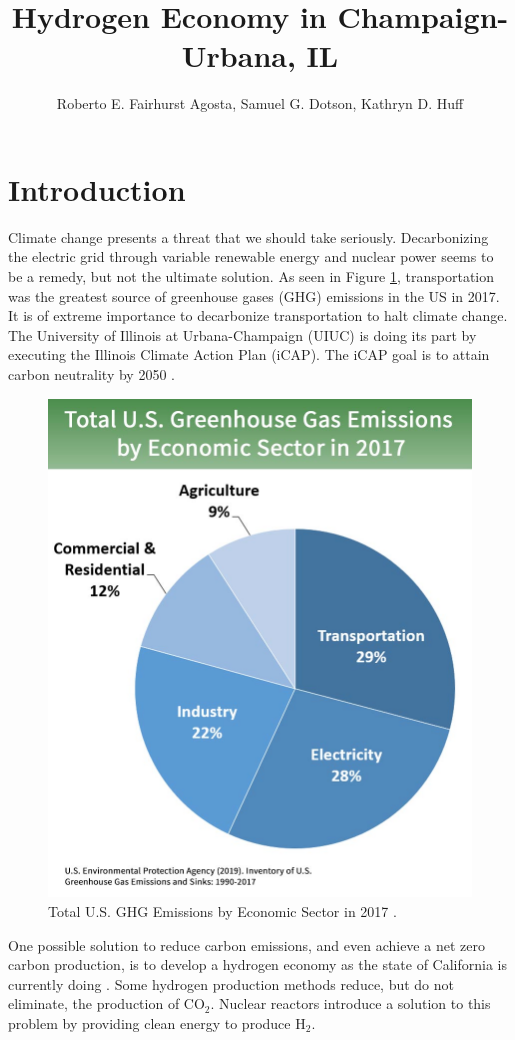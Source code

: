\documentclass{anstrans}
\title{Hydrogen Economy in Champaign-Urbana, IL}
\author{Roberto E. Fairhurst Agosta, Samuel G. Dotson, Kathryn D. Huff}
\institute{
University of Illinois at Urbana-Champaign, Dept. of Nuclear, Plasma, and Radiological Engineering\\
ref3@illinois.edu
}
\begin{document}
\section{Introduction}

Climate change presents a threat that we should take seriously. Decarbonizing the electric grid through variable renewable energy and nuclear power seems to be a remedy, but not the ultimate solution. As seen in Figure \ref{fig:ghg}, transportation was the greatest source of greenhouse gases (GHG) emissions in the US in 2017. It is of extreme importance to decarbonize transportation to halt climate change. The University of Illinois at Urbana-Champaign (UIUC) is doing its part by executing the Illinois Climate Action Plan (iCAP). The iCAP goal is to attain carbon neutrality by 2050 \cite{noauthor_illlinois_2015}.

\begin{figure}[H]
	\centering
	\includegraphics[width=0.6\linewidth]{figures/total-ghg-2019-caption.jpg}
	\hfill
	\caption{Total U.S. GHG Emissions by Economic Sector in 2017 \cite{us_epa_sources_2020}.}
	\label{fig:ghg}
\end{figure}

One possible solution to reduce carbon emissions, and even achieve a net zero carbon production, is to develop a hydrogen economy as the state of California is currently doing \cite{brown_economic_2013}. Some hydrogen production methods reduce, but do not eliminate, the production of CO$_2$. Nuclear reactors introduce a solution to this problem by providing clean energy to produce H$_2$.
\end{document}
